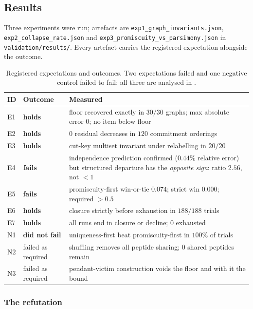 \documentclass[11pt,a4paper]{article}
\theoremstyle{definition}
\theoremstyle{remark}
\begin{document}
\subsection{Results}
\label{sec:results}

Three experiments were run; artefacts are
\texttt{exp1\_graph\_invariants.json},
\texttt{exp2\_collapse\_rate.json} and
\texttt{exp3\_promiscuity\_vs\_parsimony.json} in
\texttt{validation/results/}. Every artefact carries the registered
expectation alongside the outcome.

\begin{table}[h]
\centering
\small
\caption{Registered expectations and outcomes. Two expectations failed
and one negative control failed to fail; all three are analysed in
.}
\label{tab:results}
\begin{tabular}{@{}llp{}@{}}
\toprule
\textbf{ID} & \textbf{Outcome} & \textbf{Measured} \\
\midrule
E1 & \textbf{holds} & floor recovered exactly in $30/30$ graphs; max
absolute error $0$; no item below floor \\
E2 & \textbf{holds} & $0$ residual decreases in $120$ commitment
orderings \\
E3 & \textbf{holds} & cut-key multiset invariant under relabelling in
$20/20$ \\
E4 & \textbf{fails} & independence prediction confirmed
($0.44\%$ relative error) but structured departure has the
\emph{opposite sign}: ratio $2.56$, not $<1$ \\
E5 & \textbf{fails} & promiscuity-first win-or-tie $0.074$; strict win
$0.000$; required $>0.5$ \\
E6 & \textbf{holds} & closure strictly before exhaustion in $188/188$
trials \\
E7 & \textbf{holds} & all runs end in closure or decline; $0$ exhausted \\
\midrule
N1 & \textbf{did not fail} & uniqueness-first beat promiscuity-first in
$100\%$ of trials \\
N2 & failed as required & shuffling removes all peptide sharing;
$0$ shared peptides remain \\
N3 & failed as required & pendant-victim construction voids the floor
and with it the bound \\
\bottomrule
\end{tabular}
\end{table}

\subsubsection{The refutation}
\label{sec:refutation}
\end{document}
